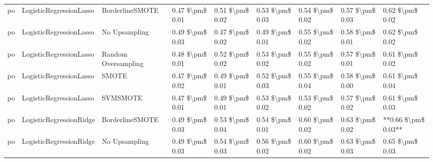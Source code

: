 \begin{tabular}{lllllllll}
      po &         LogisticRegressionLasso &               BorderlineSMOTE & 0.47 \$\textbackslash pm\$ 0.01 &           0.51 \$\textbackslash pm\$ 0.02 &       0.53 \$\textbackslash pm\$ 0.03 &        0.54 \$\textbackslash pm\$ 0.02 &                         0.57 \$\textbackslash pm\$ 0.03 &     0.62 \$\textbackslash pm\$ 0.02 \\
      po &         LogisticRegressionLasso &                 No Upsampling & 0.49 \$\textbackslash pm\$ 0.03 &           0.47 \$\textbackslash pm\$ 0.02 &       0.49 \$\textbackslash pm\$ 0.01 &        0.55 \$\textbackslash pm\$ 0.02 &                         0.58 \$\textbackslash pm\$ 0.01 &     0.62 \$\textbackslash pm\$ 0.02 \\
      po &         LogisticRegressionLasso &           Random Oversampling & 0.48 \$\textbackslash pm\$ 0.01 &           0.52 \$\textbackslash pm\$ 0.02 &       0.53 \$\textbackslash pm\$ 0.02 &        0.55 \$\textbackslash pm\$ 0.02 &                         0.57 \$\textbackslash pm\$ 0.01 &     0.61 \$\textbackslash pm\$ 0.02 \\
      po &         LogisticRegressionLasso &                         SMOTE & 0.47 \$\textbackslash pm\$ 0.02 &           0.49 \$\textbackslash pm\$ 0.01 &       0.52 \$\textbackslash pm\$ 0.03 &        0.55 \$\textbackslash pm\$ 0.04 &                         0.58 \$\textbackslash pm\$ 0.00 &     0.61 \$\textbackslash pm\$ 0.04 \\
      po &         LogisticRegressionLasso &                      SVMSMOTE & 0.47 \$\textbackslash pm\$ 0.01 &           0.49 \$\textbackslash pm\$ 0.01 &       0.53 \$\textbackslash pm\$ 0.02 &        0.53 \$\textbackslash pm\$ 0.02 &                         0.57 \$\textbackslash pm\$ 0.02 &     0.61 \$\textbackslash pm\$ 0.03 \\
      po &         LogisticRegressionRidge &               BorderlineSMOTE & 0.49 \$\textbackslash pm\$ 0.03 &           0.53 \$\textbackslash pm\$ 0.04 &       0.54 \$\textbackslash pm\$ 0.01 &        0.60 \$\textbackslash pm\$ 0.02 &                         0.63 \$\textbackslash pm\$ 0.02 & **0.66 \$\textbackslash pm\$ 0.03** \\
      po &         LogisticRegressionRidge &                 No Upsampling & 0.49 \$\textbackslash pm\$ 0.03 &           0.54 \$\textbackslash pm\$ 0.03 &       0.56 \$\textbackslash pm\$ 0.02 &        0.60 \$\textbackslash pm\$ 0.02 &                         0.63 \$\textbackslash pm\$ 0.03 &     0.65 \$\textbackslash pm\$ 0.03 \\

\end{tabular}

